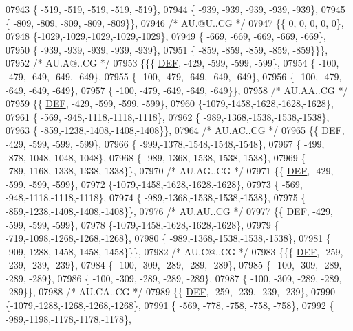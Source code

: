 \begin{DoxyCode}
07943 \{ -519, -519, -519, -519, -519\},
07944 \{ -939, -939, -939, -939, -939\},
07945 \{ -809, -809, -809, -809, -809\}\},
07946 \textcolor{comment}{/* AU.@U..CG */}
07947 \{\{    0,    0,    0,    0,    0\},
07948 \{-1029,-1029,-1029,-1029,-1029\},
07949 \{ -669, -669, -669, -669, -669\},
07950 \{ -939, -939, -939, -939, -939\},
07951 \{ -859, -859, -859, -859, -859\}\}\},
07952 \textcolor{comment}{/* AU.A@..CG */}
07953 \{\{\{  \mbox{\hyperlink{1_88_84__epars_8h_a397419fc12b37ed479c8abb9d444d843}{DEF}}, -429, -599, -599, -599\},
07954 \{ -100, -479, -649, -649, -649\},
07955 \{ -100, -479, -649, -649, -649\},
07956 \{ -100, -479, -649, -649, -649\},
07957 \{ -100, -479, -649, -649, -649\}\},
07958 \textcolor{comment}{/* AU.AA..CG */}
07959 \{\{  \mbox{\hyperlink{1_88_84__epars_8h_a397419fc12b37ed479c8abb9d444d843}{DEF}}, -429, -599, -599, -599\},
07960 \{-1079,-1458,-1628,-1628,-1628\},
07961 \{ -569, -948,-1118,-1118,-1118\},
07962 \{ -989,-1368,-1538,-1538,-1538\},
07963 \{ -859,-1238,-1408,-1408,-1408\}\},
07964 \textcolor{comment}{/* AU.AC..CG */}
07965 \{\{  \mbox{\hyperlink{1_88_84__epars_8h_a397419fc12b37ed479c8abb9d444d843}{DEF}}, -429, -599, -599, -599\},
07966 \{ -999,-1378,-1548,-1548,-1548\},
07967 \{ -499, -878,-1048,-1048,-1048\},
07968 \{ -989,-1368,-1538,-1538,-1538\},
07969 \{ -789,-1168,-1338,-1338,-1338\}\},
07970 \textcolor{comment}{/* AU.AG..CG */}
07971 \{\{  \mbox{\hyperlink{1_88_84__epars_8h_a397419fc12b37ed479c8abb9d444d843}{DEF}}, -429, -599, -599, -599\},
07972 \{-1079,-1458,-1628,-1628,-1628\},
07973 \{ -569, -948,-1118,-1118,-1118\},
07974 \{ -989,-1368,-1538,-1538,-1538\},
07975 \{ -859,-1238,-1408,-1408,-1408\}\},
07976 \textcolor{comment}{/* AU.AU..CG */}
07977 \{\{  \mbox{\hyperlink{1_88_84__epars_8h_a397419fc12b37ed479c8abb9d444d843}{DEF}}, -429, -599, -599, -599\},
07978 \{-1079,-1458,-1628,-1628,-1628\},
07979 \{ -719,-1098,-1268,-1268,-1268\},
07980 \{ -989,-1368,-1538,-1538,-1538\},
07981 \{ -909,-1288,-1458,-1458,-1458\}\}\},
07982 \textcolor{comment}{/* AU.C@..CG */}
07983 \{\{\{  \mbox{\hyperlink{1_88_84__epars_8h_a397419fc12b37ed479c8abb9d444d843}{DEF}}, -259, -239, -239, -239\},
07984 \{ -100, -309, -289, -289, -289\},
07985 \{ -100, -309, -289, -289, -289\},
07986 \{ -100, -309, -289, -289, -289\},
07987 \{ -100, -309, -289, -289, -289\}\},
07988 \textcolor{comment}{/* AU.CA..CG */}
07989 \{\{  \mbox{\hyperlink{1_88_84__epars_8h_a397419fc12b37ed479c8abb9d444d843}{DEF}}, -259, -239, -239, -239\},
07990 \{-1079,-1288,-1268,-1268,-1268\},
07991 \{ -569, -778, -758, -758, -758\},
07992 \{ -989,-1198,-1178,-1178,-1178\},

\end{DoxyCode}
